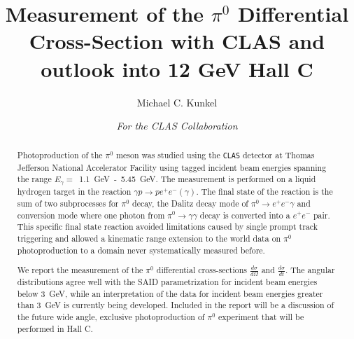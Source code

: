\documentclass{aip-cp}
\begin{document}
\title{Measurement of the $\pi^0$ Differential Cross-Section with CLAS and outlook into 12 GeV Hall C}

\author[aff1]{Michael C. Kunkel}
\author{\textit{For the CLAS Collaboration}}
\maketitle

\begin{abstract}
Photoproduction of the $\pi^0$ meson was studied using the \textsc{\texttt{CLAS}} detector at Thomas Jefferson National Accelerator Facility using tagged incident beam energies spanning the range $E_{\gamma}=$~1.1~GeV~-~5.45~GeV. The measurement is performed on a liquid hydrogen target in the reaction $\gamma p\to pe^+e^-(\gamma)$. The final state of the reaction is the sum of two subprocesses for $\pi^0$ decay, the Dalitz decay mode of $\pi^0\to e^+e^-\gamma$ and conversion mode where one photon from $\pi^0\to \gamma\gamma$ decay is converted into a $e^+e^-$ pair. This specific final state reaction avoided limitations caused by single prompt track triggering and allowed a kinematic range extension to the world data on $\pi^0$ photoproduction to a domain never systematically measured before.

We report the measurement of the $\pi^0$ differential cross-sections $\frac{d\sigma}{d\Omega}$ and $\frac{d\sigma}{dt}$. The angular distributions agree well with the SAID parametrization for incident beam energies below 3~GeV, while an interpretation of the data for incident beam energies greater than 3~GeV is currently being developed. Included in the report will be a discussion of the future wide angle, exclusive photoproduction of $\pi^0$ experiment that will be performed in Hall C.
\end{abstract}

\end{document}
